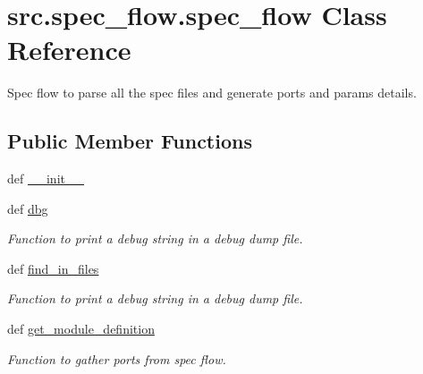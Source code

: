 \hypertarget{classsrc_1_1spec__flow_1_1spec__flow}{\section{src.\-spec\-\_\-flow.\-spec\-\_\-flow Class Reference}
\label{classsrc_1_1spec__flow_1_1spec__flow}
}


Spec flow to parse all the spec files and generate ports and params details.  


\subsection*{Public Member Functions}
\begin{DoxyCompactItemize}
\item 
def \hyperlink{classsrc_1_1spec__flow_1_1spec__flow_a6757af660d640f3b5d56d8e50fec66a6}{\-\_\-\-\_\-init\-\_\-\-\_\-}
\item 
def \hyperlink{classsrc_1_1spec__flow_1_1spec__flow_a756d1f4e2d357867a3080c7aa9c41af8}{dbg}
\begin{DoxyCompactList}\small\item\em Function to print a debug string in a debug dump file. \end{DoxyCompactList}\item 
def \hyperlink{classsrc_1_1spec__flow_1_1spec__flow_ab092eab2cfdda30353475676e0e22a4d}{find\-\_\-in\-\_\-files}
\begin{DoxyCompactList}\small\item\em Function to print a debug string in a debug dump file. \end{DoxyCompactList}\item 
def \hyperlink{classsrc_1_1spec__flow_1_1spec__flow_aca22fae70d0e3b3fa84853a03216bba8}{get\-\_\-module\-\_\-definition}
\begin{DoxyCompactList}\small\item\em Function to gather ports from spec flow. \end{DoxyCompactList}\end{DoxyCompactItemize}
